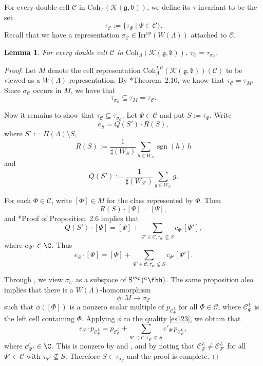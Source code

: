 \documentclass[12pt]{amsart}
\def\subset{\subseteq}
\newcommand{\CC}{{\mathcal {C}}}
\newcommand{\CK}{{\mathcal {K}}}
\def\CCLR{\CC^{LR}}
\newcommand{\sgn}{\operatorname{sgn}}
\newcommand{\oS}{\operatorname{S}}
\newcommand{\g}{\mathfrak g}
\renewcommand{\b}{\mathfrak b}
\newcommand{\be}{\begin {equation}}
\newcommand{\ee}{\end {equation}}
\numberwithin{equation}{section}
\newtheorem{lem}[thm]{Lemma}
\theoremstyle{remark}
\def\Irrsp{\mathrm{Irr}^{\mathrm{sp}}}
\def\hha{{}^a\fhh}
\def\Coh{\mathrm{Coh}}
\begin{document}
 For every double cell $\CC$ in $\Coh_\Lambda(\CK(\g,\b))$, we define its $\tau$-invariant
to be the set
\[
  \tau_{\CC}:=\{\tau_\Psi\mid \Psi\in \CC\}.
\]
Recall that we have a representation $\sigma_\CC\in \Irrsp{(W(\Lambda))}$ attached to $\CC$.

\begin{lem}\label{eqtau0}
For every  double cell $\CC$ in $\Coh_\Lambda(\CK(\g,\b))$, $\tau_\CC=\tau_{\sigma_{\CC}}$.
\end{lem}
\begin{proof}
  Let $M$ denote the cell representation $\Coh^{LR}_{\Lambda}( \CK(\g,\b))(\CC)$ to be viewed as a
  $W(\Lambda)$-representation. By \cite{FJMN}*{Theorem~2.10}, we know that
  $\tau_{\CC}=\tau_M$. Since $\sigma_\CC$ occurs in $M$, we have that
  \[
  \tau_{\sigma_{\CC}}\subset \tau_M =  \tau_{\CC}.
  \]

  Now it remains to show that $\tau_{\CC} \subset \tau_{\sigma_{\CC}}$.
  Let $\Psi\in \CC$ and put  $S:=\tau_\Psi$.
  Write
  \[
    e_S=Q(S')\cdot R(S),
  \]
  where $S':=\Pi(\Lambda)\setminus S$,
\[
R(S):=
\frac{1}{ \sharp(W_S)}\sum_{h\in W_{S}} \sgn(h)\,h
\]
  and
\[
Q(S'):=
\frac{1}{ \sharp(W_{S'})}\sum_{g\in W_{S'}} g.
\]

For each $\Phi\in \CC$, write $[\Phi]\in M$ for the class represented by $\Phi$.
Then
\[
  R(S)\cdot [\Psi]=[\Psi],
\]
and
 \cite{FJMN}*{Proof of Proposition~2.6}
 implies that
 \[
  Q(S')\cdot [\Psi]=[\Psi]+\sum_{\Psi'\in \CC, \tau_{\Psi'}\not\subset S} c_{\Psi'} [\Psi'],
 \]
 where $c_{\Psi'}\in \C$. Thus
 \be\label{es123}
  e_S\cdot [\Psi]=[\Psi]+\sum_{\Psi'\in \CC, \tau_{\Psi'}\not\subset S} c_{\Psi'} [\Psi'].
  \ee

 Through , we view $\sigma_\CC$ as a subspace of $\oS^{m_\CC}(\hha)$. The same proposition also implies that there is a $W(\Lambda)$-homomorphism
 \[
 \phi: M\rightarrow \sigma_{\CC}
 \]
 such that $\phi([\Phi])$ is a nonzero scalar multiple of $p_{\CC^L_{\Phi}}$ for all $\Phi\in \CC$, where $\CC^L_{\Phi}$ is the left cell containing $\Phi$. Applying $\phi$ to the quality \eqref{es123}, we obtain that
 \[
 e_S\cdot p_{\CC^L_\Psi}=p_{\CC^L_\Psi}+\sum_{\Psi'\in \CC, \tau_{\Psi'}\not\subset S} c'_{\Psi'} p_{\CC^L_{\Psi'}},
 \]
 where $c'_{\Psi'}\in \C$.
 This is nonzero by  and , and by noting that  $\CC_{\Psi}^L \neq \CC_{\Psi'}^L$ for all $\Psi'\in \CC$ with $\tau_{\Psi'}\not\subset S$.
  Therefore $S\in \tau_{\sigma_{\CC}}$ and the proof is complete.
 \end{proof}
\end{document}

